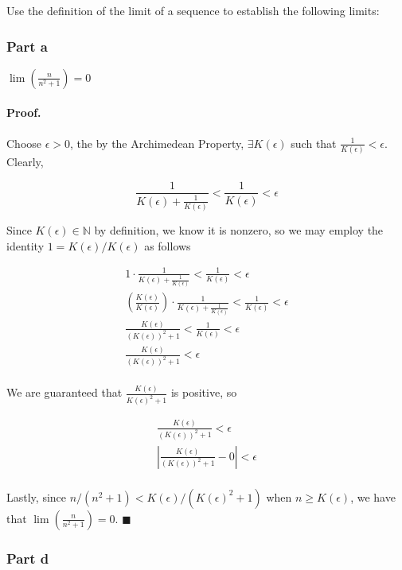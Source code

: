 \documentclass[paper=a4, fontsize=11pt]{scrartcl} %
\numberwithin{equation}{section} %
\numberwithin{figure}{section} %
\numberwithin{table}{section} %
\begin{document}
Use the definition of the limit of a sequence to establish the following limits:

\subsubsection*{Part a}

$\lim(\frac{n}{n^2 + 1}) = 0$

\newcommand{\kep}{K(\epsilon)}
\paragraph{Proof.} Choose $\epsilon > 0$, the by the Archimedean Property, $\exists \kep$ such that $\frac{1}{\kep} < \epsilon$. Clearly,

\begin{equation}
\frac{1}{\kep + \frac{1}{\kep}} < \frac{1}{\kep} < \epsilon
\end{equation}

Since $\kep \in \mathbb{N}$ by definition, we know it is nonzero, so we may employ the identity $1 = \kep/\kep$ as follows

\begin{gather*}
1\cdot\frac{1}{\kep + \frac{1}{\kep}} < \frac{1}{\kep} < \epsilon \\
\left(\frac{\kep}{\kep}\right)\cdot\frac{1}{\kep + \frac{1}{\kep}} < \frac{1}{\kep} < \epsilon \\
\frac{\kep}{(\kep)^2 + 1} < \frac{1}{\kep} < \epsilon \\
\frac{\kep}{(\kep)^2 + 1} < \epsilon \\
\end{gather*}

We are guaranteed that $\frac{\kep}{\kep ^2 + 1}$ is positive, so 

\begin{gather*}
\frac{\kep}{(\kep)^2 + 1} < \epsilon \\
\left|\frac{\kep}{(\kep)^2 + 1} - 0\right| < \epsilon \\
\end{gather*}

Lastly, since $n/(n^2 + 1) < \kep/(\kep ^2 + 1)$ when $n \geq \kep$, we have that $\lim(\frac{n}{n^2 + 1}) = 0$. $\blacksquare$\\

\subsubsection*{Part d}
\end{document}
